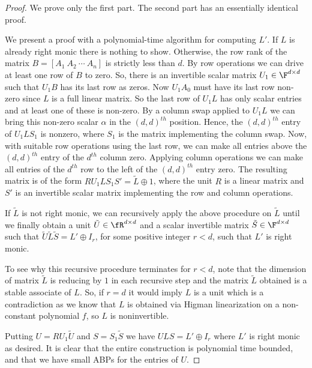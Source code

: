 \begin{proof}
We prove only the first part. The second part has an essentially
identical proof.

We present a proof with a polynomial-time algorithm for computing
$L'$. If $L$ is already right monic there is nothing to
show. Otherwise, the row rank of the matrix $B = [A_1~A_2~\cdots~A_n]$
is strictly less than $d$. By row operations we can drive at least one
row of $B$ to zero. So, there is an invertible scalar matrix $U_1\in
\F^{d\times d}$ such that $U_1B$ has its last row as zeros. Now
$U_1A_0$ must have its last row non-zero since $L$ is a full linear
matrix. So the last row of $U_1L$ has only scalar entries and at least
one of these is non-zero. By a column swap applied to $U_1L$ we can
bring this non-zero scalar $\alpha$ in the $(d,d)^{th}$
position. Hence, the $(d,d)^{th}$ entry of $U_1LS_1$ is nonzero, where
$S_1$ is the matrix implementing the column swap. Now, with suitable
row operations using the last row, we can make all entries above the
$(d,d)^{th}$ entry of the $d^{th}$ column zero. Applying column
operations we can make all entries of the $d^{th}$ row to the left of
the $(d,d)^{th}$ entry zero. The resulting matrix is of the form
$RU_1LS_1S' = \tilde{L}\oplus 1$, where the unit $R$ is a linear
matrix and $S'$ is an invertible scalar matrix implementing the row
and column operations.

If $\tilde{L}$ is not right monic, we can recursively apply the above
procedure on $\tilde{L}$ until we finally obtain a unit
$\tilde{U}\in\fR^{d\times d}$ and a scalar invertible matrix
$\tilde{S}\in\F^{d\times d}$ such that $\tilde{U}\tilde{L} \tilde{S}=
L' \oplus I_r$, for some positive integer $r<d$, such that $L'$ is
right monic.

%
%
%
%
%
%
%
%
%
%

%
%
%
%

%
%
%
%

To see why this recursive procedure terminates for $r<d$, note that
the dimension of matrix $\tilde{L}$ is reducing by $1$ in each
recursive step and the matrix $\tilde{L}$ obtained is a stable
associate of $L$. So, if $r=d$ it would imply $L$ is a unit which is a
contradiction as we know that $L$ is obtained via Higman linearization
on a non-constant polynomial $f$, so $L$ is noninvertible.

Putting $U=RU_1\tilde{U}$ and $S=S_1\tilde{S}$ we have $ULS=L'\oplus
I_r$ where $L'$ is right monic as desired. It is clear that the entire
construction is polynomial time bounded, and that we have small ABPs
for the entries of $U$.
\end{proof}

